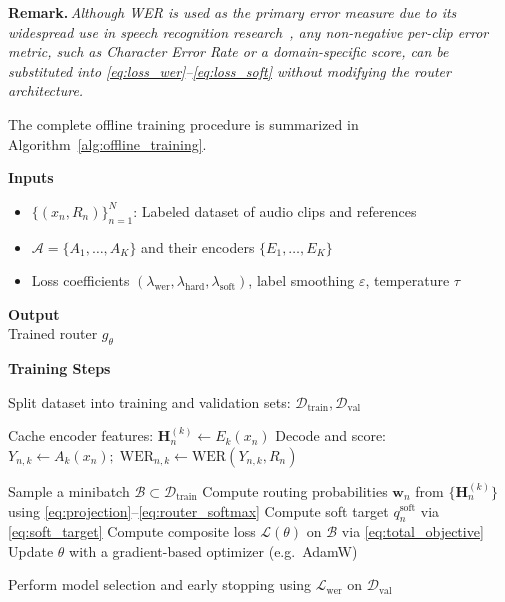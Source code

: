 \documentclass[journal]{IEEEtran}
\begin{document}
\vspace{0.1cm}
\noindent\textbf{Remark.}\,\textit{Although WER is used as the
primary error measure due to its widespread use in speech recognition
research~\cite{yu2016asrdeep,li2014overviewrobust}, any non-negative
per-clip error metric, such as Character Error Rate or a
domain-specific score, can be substituted into
\eqref{eq:loss_wer}--\eqref{eq:loss_soft} without modifying the
router architecture.}
\vspace{0.1cm}

The complete offline training procedure is summarized in
Algorithm~\ref{alg:offline_training}.

\begin{algorithm}
\small
\caption{Offline Training of the Hierarchical Router}
\label{alg:offline_training}

\textbf{Inputs}
\begin{itemize}
\item $\{(x_n,R_n)\}_{n=1}^{N}$: Labeled dataset of audio clips and references
\item $\mathcal{A}=\{A_1,\dots,A_K\}$ and their encoders $\{E_1,\dots,E_K\}$
\item Loss coefficients $(\lambda_{\text{wer}},\lambda_{\text{hard}},\lambda_{\text{soft}})$, label smoothing $\varepsilon$, temperature $\tau$
\end{itemize}

\textbf{Output} \\
Trained router $g_{\theta}$

\textbf{Training Steps}
\begin{algorithmic}[1]
\State Split dataset into training and validation sets:
$\mathcal{D}_{\text{train}}, \mathcal{D}_{\text{val}}$

        \State Cache encoder features:
        $\mathbf{H}_n^{(k)} \gets E_k(x_n)$
        \State Decode and score:
        $Y_{n,k} \gets A_k(x_n);\;
        \mathrm{WER}_{n,k}\gets\mathrm{WER}(Y_{n,k},R_n)$
    \EndFor
\EndFor

    \State Sample a minibatch $\mathcal{B}\subset\mathcal{D}_{\text{train}}$
    \State Compute routing probabilities
    $\mathbf{w}_n$ from $\{\mathbf{H}_n^{(k)}\}$ using
    \eqref{eq:projection}--\eqref{eq:router_softmax}
    \State Compute soft target $q^{\mathrm{soft}}_n$ via \eqref{eq:soft_target}
    \State Compute composite loss $\mathcal{L}(\theta)$ on $\mathcal{B}$ via \eqref{eq:total_objective}
    \State Update $\theta$ with a gradient-based optimizer (e.g.\ AdamW)
\EndFor

\State Perform model selection and early stopping using
$\mathcal{L}_{\text{wer}}$ on $\mathcal{D}_{\text{val}}$
\end{algorithmic}
\end{algorithm}
\end{document}
